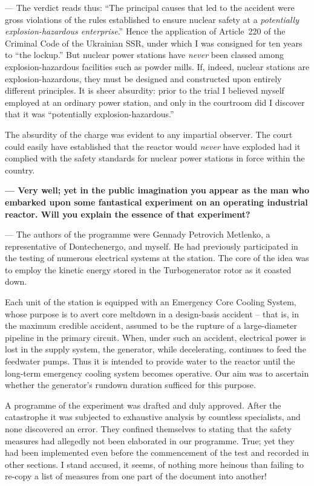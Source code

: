 \documentclass[openright]{bookest}
\begin{document}
\noindent
--- The verdict reads thus: ``The principal causes that led to the accident were gross violations of the rules established to ensure nuclear safety at a \textit{potentially explosion-hazardous enterprise}.'' Hence the application of Article~220 of the Criminal Code of the Ukrainian SSR, under which I was consigned for ten years to ``the lockup.'' But nuclear power stations have \textit{never} been classed among explosion-hazardous facilities such as powder mills. If, indeed, nuclear stations are explosion-hazardous, they must be designed and constructed upon entirely different principles. It is sheer absurdity: prior to the trial I believed myself employed at an ordinary power station, and only in the courtroom did I discover that it was ``potentially explosion-hazardous.''

The absurdity of the charge was evident to any impartial observer. The court could easily have established that the reactor would \textit{never} have exploded had it complied with the safety standards for nuclear power stations in force within the country.

\medskip

\textbf{--- Very well; yet in the public imagination you appear as the man who embarked upon some fantastical experiment on an operating industrial reactor. Will you explain the essence of that experiment?}

\noindent
--- The authors of the programme were Gennady Petrovich Metlenko, a representative of Dontechenergo, and myself. He had previously participated in the testing of numerous electrical systems at the station. The core of the idea was to employ the kinetic energy stored in the Turbogenerator rotor as it coasted down.

Each unit of the station is equipped with an Emergency Core Cooling System, whose purpose is to avert core meltdown in a design-basis accident -- that is, in the maximum credible accident, assumed to be the rupture of a large-diameter pipeline in the primary circuit. When, under such an accident, electrical power is lost in the supply system, the generator, while decelerating, continues to feed the feedwater pumps. Thus it is intended to provide water to the reactor until the long-term emergency cooling system becomes operative. Our aim was to ascertain whether the generator's rundown duration sufficed for this purpose.

A programme of the experiment was drafted and duly approved. After the catastrophe it was subjected to exhaustive analysis by countless specialists, and none discovered an error. They confined themselves to stating that the safety measures had allegedly not been elaborated in our programme. True; yet they had been implemented even before the commencement of the test and recorded in other sections. I stand accused, it seems, of nothing more heinous than failing to re-copy a list of measures from one part of the document into another!
\end{document}

